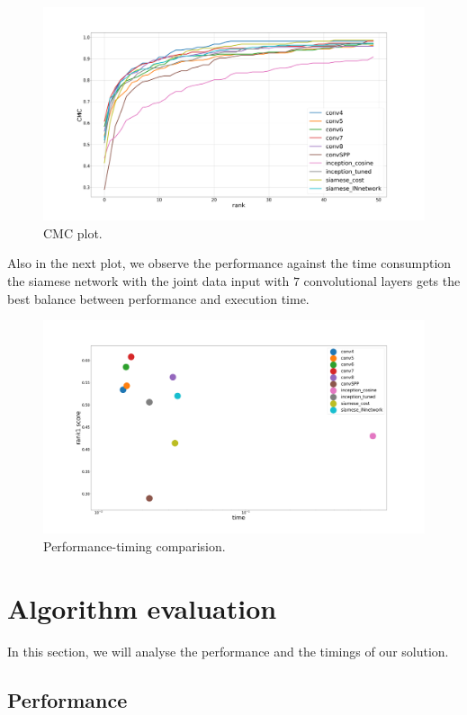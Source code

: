\begin{figure}[hptb]
\centering         
\includegraphics[width=12cm]{siameseDev/cmcNetwors.png}
\caption{CMC plot.} \label{lossesSiam2}
\end{figure}

Also in the next plot, we observe the performance against the time consumption the siamese network with the joint data input with $7$ convolutional layers gets the best balance between performance and execution time. 

\begin{figure}[hptb]
\centering         
\includegraphics[width=12cm]{siameseDev/results.png}
\caption{Performance-timing comparision.} \label{lossesSiam3}
\end{figure}




\section{Algorithm evaluation}



In this section, we will analyse the performance and the timings of our solution.

\subsection{Performance}

